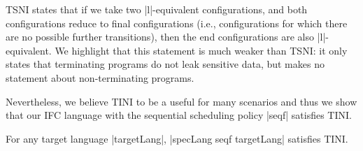 TSNI states that if we take two |l|-equivalent configurations, and both
configurations reduce to final configurations (i.e.,
configurations for which there are no
possible further transitions), then the end configurations are also
|l|-equivalent.
%
We highlight that this statement is much weaker than TSNI: it only states that
terminating programs do not leak sensitive data, but makes no statement
about non-terminating programs.

Nevertheless, we believe TINI to be a useful for many scenarios and thus we
show that our IFC language with the sequential scheduling policy |seqf|
satisfies TINI.
%
\begin{theorem}
  \label{thm:seq-tini}
For any target language |targetLang|, |specLang seqf targetLang| satisfies TINI.
\end{theorem}
